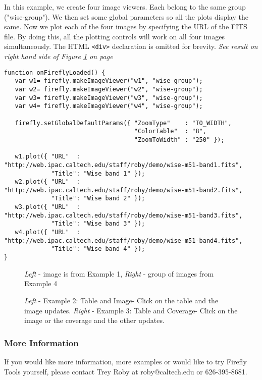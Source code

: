 \documentclass[11pt,twoside]{article}
\begin{document}
In this example, we create four image viewers. Each belong to the same group ("wise-group").  We then set some global parameters so all the plots display the same.  
Now we plot each of the four images by specifying the URL of the FITS file.  
By doing this, all the plotting controls will work on all four images simultaneously. 
The HTML \scriptsize\texttt{<div>} \normalsize declaration is omitted for brevity.
\small
\textit{See result on right hand side of Figure \ref{examples14} on page~\pageref{examples14}}
\normalsize
\scriptsize
\begin{verbatim}
function onFireflyLoaded() {
   var w1= firefly.makeImageViewer("w1", "wise-group");
   var w2= firefly.makeImageViewer("w2", "wise-group");
   var w3= firefly.makeImageViewer("w3", "wise-group");
   var w4= firefly.makeImageViewer("w4", "wise-group");

   firefly.setGlobalDefaultParams({ "ZoomType"    : "TO_WIDTH",
                                    "ColorTable"  : "8",
                                    "ZoomToWidth" : "250" });

   w1.plot({ "URL"  : "http://web.ipac.caltech.edu/staff/roby/demo/wise-m51-band1.fits",
             "Title": "Wise band 1" });
   w2.plot({ "URL"  : "http://web.ipac.caltech.edu/staff/roby/demo/wise-m51-band2.fits",
             "Title": "Wise band 2" });
   w3.plot({ "URL"  : "http://web.ipac.caltech.edu/staff/roby/demo/wise-m51-band3.fits",
             "Title": "Wise band 3" });
   w4.plot({ "URL"  : "http://web.ipac.caltech.edu/staff/roby/demo/wise-m51-band4.fits",
             "Title": "Wise band 4" });
}
\end{verbatim}
\normalsize



\begin{figure}[!ht]
\caption{\small \textit{Left} - image is from Example 1, \textit{Right} - group of images from Example 4}
\label{examples14}
\end{figure}


\begin{figure}[!ht]
\caption{\small \newline \textit{Left} - Example 2: Table and Image- Click on the table and the image updates. 
\newline \textit{Right} - Example 3: Table and Coverage- Click on the image or the coverage and the other updates.}
\label{table-and-preview}
\end{figure}
\normalsize

\subsubsection*{More Information}
If you would like more information, more examples or would like to try Firefly Tools 
yourself, please contact Trey Roby at roby@caltech.edu or 626-395-8681.
\end{document}

